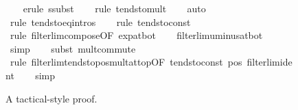 \documentclass{article}
\theoremstyle{definition}
\begin{document}
\begin{figure}
\begin{isabellebody}
\ \ \isamarkupfalse%
\ {\isacharparenleft}erule\ ssubst{\isacharparenright}\isanewline
\ \ \isamarkupfalse%
\ {\isacharparenleft}rule\ tendsto{\isacharunderscore}mult{\isacharparenright}{\isacharplus}\isanewline
\ \ \isamarkupfalse%
\ auto\isanewline
\ \ \isamarkupfalse%
\ {\isacharparenleft}rule\ tendsto{\isacharunderscore}eq{\isacharunderscore}intros{\isacharparenright}\isanewline
\ \ \isamarkupfalse%
\ {\isacharparenleft}rule\ tendsto{\isacharunderscore}const{\isacharparenright}\isanewline
\ \ \isamarkupfalse%
\ {\isacharparenleft}rule\ filterlim{\isacharunderscore}compose{\isacharbrackleft}OF\ exp{\isacharunderscore}at{\isacharunderscore}bot{\isacharbrackright}{\isacharparenright}\isanewline
\ \ \isamarkupfalse%
\ filterlim{\isacharunderscore}uminus{\isacharunderscore}at{\isacharunderscore}bot\isanewline
\ \ \isamarkupfalse%
\ simp\isanewline
\ \ \isamarkupfalse%
\ {\isacharparenleft}subst\ mult{\isachardot}commute{\isacharparenright}\isanewline
\ \ \isamarkupfalse%
\ {\isacharparenleft}rule\ filterlim{\isacharunderscore}tendsto{\isacharunderscore}pos{\isacharunderscore}mult{\isacharunderscore}at{\isacharunderscore}top{\isacharbrackleft}OF\ tendsto{\isacharunderscore}const\ pos\ filterlim{\isacharunderscore}ident{\isacharbrackright}{\isacharparenright}\isanewline
\ \ \isamarkupfalse%
\ simp\isanewline
\ \ \isamarkupfalse%
\end{isabellebody}
\caption{A tactical-style proof.}
\label{fig:tact}
\end{figure}
\end{document}
